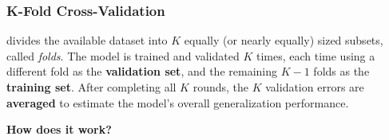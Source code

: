 \subsubsection{K-Fold Cross-Validation}\label{sec:k-fold-cross-validation}

 divides the available dataset into $K$ equally (or nearly equally) sized subsets, called \emph{folds}. The model is trained and validated $K$ times, each time using a different fold as the \textbf{validation set}, and the remaining $K-1$ folds as the \textbf{training set}. After completing all $K$ rounds, the $K$ validation errors are \textbf{averaged} to estimate the model's overall generalization performance.

\highspace
\begin{flushleft}
    \textcolor{Green3}{ \textbf{How does it work?}}
\end{flushleft}
